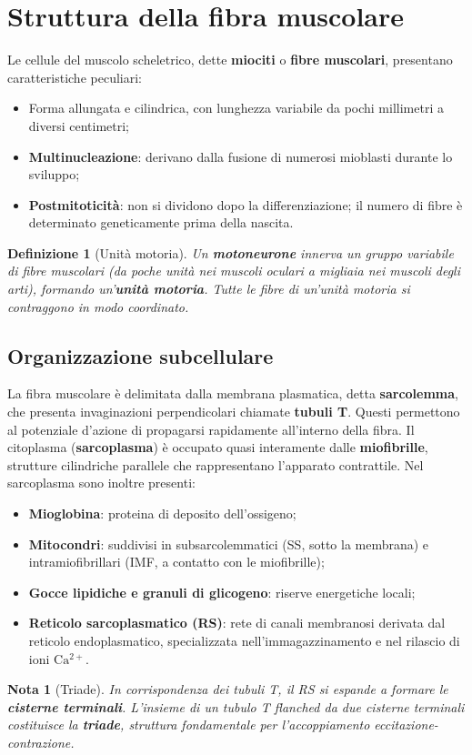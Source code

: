 \documentclass[12pt,a4paper]{report}
\newtheorem{definizione}{Definizione}[section]
\newtheorem{nota}{Nota}[section]
\begin{document}
\section{Struttura della fibra muscolare}
Le cellule del muscolo scheletrico, dette \textbf{miociti} o \textbf{fibre muscolari}, presentano caratteristiche peculiari:
\begin{itemize}
\item Forma allungata e cilindrica, con lunghezza variabile da pochi millimetri a diversi centimetri;
\item \textbf{Multinucleazione}: derivano dalla fusione di numerosi mioblasti durante lo sviluppo;
\item \textbf{Postmitoticità}: non si dividono dopo la differenziazione; il numero di fibre è determinato geneticamente prima della nascita.
\end{itemize}
\begin{definizione}[Unità motoria]
Un \textbf{motoneurone} innerva un gruppo variabile di fibre muscolari (da poche unità nei muscoli oculari a migliaia nei muscoli degli arti), formando un'\textbf{unità motoria}. Tutte le fibre di un'unità motoria si contraggono in modo coordinato.
\end{definizione}
\subsection{Organizzazione subcellulare}
La fibra muscolare è delimitata dalla membrana plasmatica, detta \textbf{sarcolemma}, che presenta invaginazioni perpendicolari chiamate \textbf{tubuli T}. Questi permettono al potenziale d'azione di propagarsi rapidamente all'interno della fibra.
Il citoplasma (\textbf{sarcoplasma}) è occupato quasi interamente dalle \textbf{miofibrille}, strutture cilindriche parallele che rappresentano l'apparato contrattile. Nel sarcoplasma sono inoltre presenti:
\begin{itemize}
\item \textbf{Mioglobina}: proteina di deposito dell'ossigeno;
\item \textbf{Mitocondri}: suddivisi in subsarcolemmatici (SS, sotto la membrana) e intramiofibrillari (IMF, a contatto con le miofibrille);
\item \textbf{Gocce lipidiche e granuli di glicogeno}: riserve energetiche locali;
\item \textbf{Reticolo sarcoplasmatico (RS)}: rete di canali membranosi derivata dal reticolo endoplasmatico, specializzata nell'immagazzinamento e nel rilascio di ioni \(\mathrm{Ca^{2+}}\).
\end{itemize}
\begin{nota}[Triade]
In corrispondenza dei tubuli T, il RS si espande a formare le \textbf{cisterne terminali}. L'insieme di un tubulo T flanched da due cisterne terminali costituisce la \textbf{triade}, struttura fondamentale per l'accoppiamento eccitazione-contrazione.
\end{nota}
\end{document}
